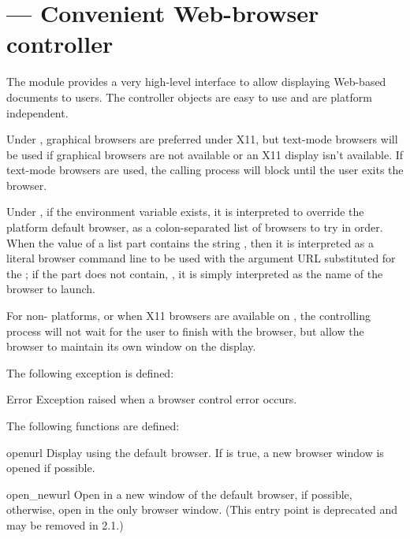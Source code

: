 \section{ ---
         Convenient Web-browser controller}


The  module provides a very high-level interface to
allow displaying Web-based documents to users.  The controller objects
are easy to use and are platform independent.

Under \UNIX, graphical browsers are preferred under X11, but text-mode
browsers will be used if graphical browsers are not available or an X11
display isn't available.  If text-mode browsers are used, the calling
process will block until the user exits the browser.

Under \UNIX, if the environment variable  exists, it
is interpreted to override the platform default browser, as a
colon-separated list of browsers to try in order.  When the value of
a list part contains the string , then it is interpreted as
a literal browser command line to be used with the argument URL
substituted for the ; if the part does not contain,
, it is simply interpreted as the name of the browser to
launch.

For non-\UNIX{} platforms, or when X11 browsers are available on
\UNIX, the controlling process will not wait for the user to finish
with the browser, but allow the browser to maintain its own window on
the display.

The following exception is defined:

\begin{excdesc}{Error}
  Exception raised when a browser control error occurs.
\end{excdesc}

The following functions are defined:

\begin{funcdesc}{open}{url}
  Display  using the default browser.  If  is true,
  a new browser window is opened if possible.
\end{funcdesc}

\begin{funcdesc}{open_new}{url}
  Open  in a new window of the default browser, if possible,
  otherwise, open  in the only browser window.  (This entry
  point is deprecated and may be removed in 2.1.)
\end{funcdesc}

